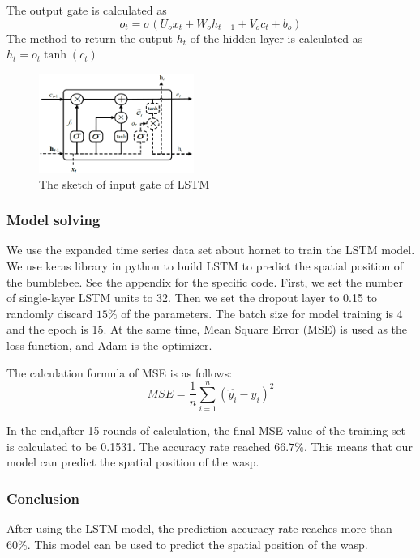 \documentclass{mcmthesis}
\begin{document}
The output gate is calculated as
\begin{equation}
	o_t=\sigma(U_ox_t+W_oh_{t-1}+V_oc_{t}+b_o)
\end{equation}
The method to return the output $ h_t $ of the hidden layer is calculated as
$ h_t=o_t\tanh(c_t) $

\begin{figure}[H]
	\centering
	\includegraphics[width=0.45\textwidth]{tu7.png}
	\caption{The sketch of input gate of LSTM}
\end{figure}
\subsubsection{Model solving}
We use the expanded  time series data set about hornet to train the LSTM model. We use  keras library in python to build LSTM to predict the spatial position of the bumblebee. See the appendix for the specific code. First, we set the number of single-layer LSTM units to 32. Then we set the dropout layer to 0.15 to randomly discard $ 15\% $ of the parameters. The batch size for model training is 4 and the epoch is 15. At the same time, Mean Square Error (MSE) is used as the loss function, and Adam is the optimizer.

The calculation formula of MSE is as follows:
\begin{equation}
	MSE=\frac{1}{n}\sum_{i=1}^{n}(\hat{y_i}-y_i)^2
\end{equation}

In the end,after 15 rounds of calculation, the final MSE value of the training set is calculated to be 0.1531. The accuracy rate reached $ 66.7\% $. This means that our model can predict the spatial position of the wasp.

\hspace*{\fill}
\subsubsection{Conclusion}
After using the LSTM model, the prediction accuracy rate reaches more than $ 60\% $. This model can be used to predict the spatial position of the wasp.
\end{document}

